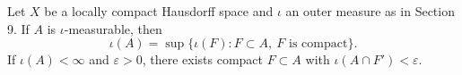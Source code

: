 Let $X$ be a locally compact Hausdorff space and $\iota$ an outer measure as in Section 9. If $A$ is $\iota$-measurable, then
$$\iota(A) = \sup\{\iota(F) : F \subset A,\ F \text{ is compact}\}.$$
If $\iota(A) < \infty$ and $\varepsilon > 0$, there exists compact $F \subset A$ with $\iota(A \cap F') < \varepsilon$.